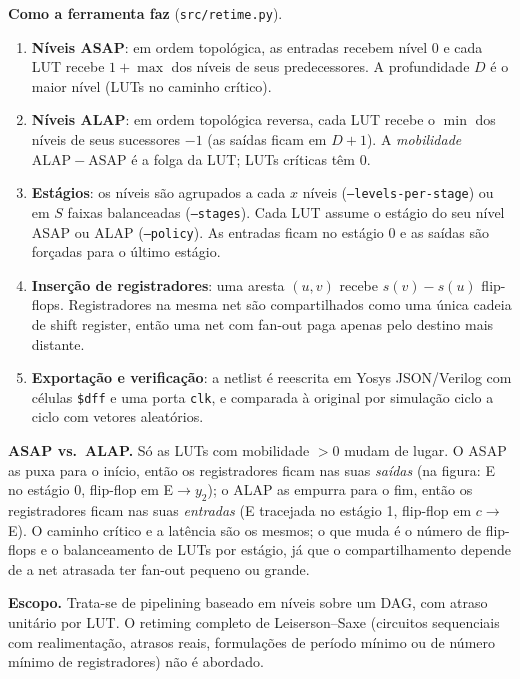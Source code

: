 \documentclass[10pt]{article}
\begin{document}
\textbf{Como a ferramenta faz} (\texttt{src/retime.py}).
\begin{enumerate}[label=\arabic*.]
  \item \textbf{Níveis ASAP}: em ordem topológica, as entradas recebem nível 0 e cada LUT recebe
        $1+\max$ dos níveis de seus predecessores. A profundidade $D$ é o maior nível (LUTs no caminho crítico).
  \item \textbf{Níveis ALAP}: em ordem topológica reversa, cada LUT recebe o $\min$ dos níveis de seus sucessores $-1$
        (as saídas ficam em $D+1$). A \emph{mobilidade} $\mathrm{ALAP}-\mathrm{ASAP}$ é a folga da LUT; LUTs críticas têm 0.
  \item \textbf{Estágios}: os níveis são agrupados a cada $x$ níveis (\texttt{--levels-per-stage}) ou em $S$ faixas
        balanceadas (\texttt{--stages}). Cada LUT assume o estágio do seu nível ASAP ou ALAP (\texttt{--policy}).
        As entradas ficam no estágio 0 e as saídas são forçadas para o último estágio.
  \item \textbf{Inserção de registradores}: uma aresta $(u,v)$ recebe $s(v)-s(u)$ flip-flops. Registradores na mesma
        net são compartilhados como uma única cadeia de shift register, então uma net com fan-out paga apenas pelo
        destino mais distante.
  \item \textbf{Exportação e verificação}: a netlist é reescrita em Yosys JSON/Verilog com células \texttt{\$dff} e uma
        porta \texttt{clk}, e comparada à original por simulação ciclo a ciclo com vetores aleatórios.
\end{enumerate}

\textbf{ASAP vs.\ ALAP.} Só as LUTs com mobilidade $>0$ mudam de lugar. O ASAP as puxa para o início, então os
registradores ficam nas suas \emph{saídas} (na figura: E no estágio 0, flip-flop em E$\to y_2$); o ALAP as empurra para
o fim, então os registradores ficam nas suas \emph{entradas} (E tracejada no estágio 1, flip-flop em $c\to$E). O caminho
crítico e a latência são os mesmos; o que muda é o número de flip-flops e o balanceamento de LUTs por estágio, já que o
compartilhamento depende de a net atrasada ter fan-out pequeno ou grande.

\textbf{Escopo.} Trata-se de pipelining baseado em níveis sobre um DAG, com atraso unitário por LUT. O retiming
completo de Leiserson--Saxe (circuitos sequenciais com realimentação, atrasos reais, formulações de período mínimo ou
de número mínimo de registradores) não é abordado.
\end{document}

